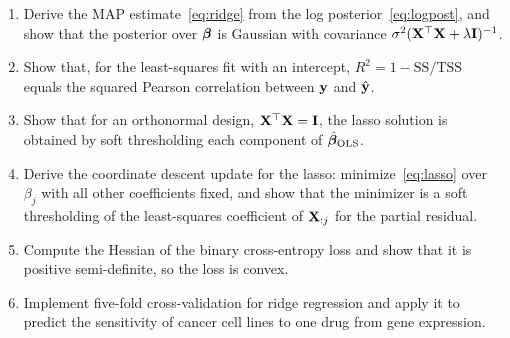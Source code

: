 \begin{enumerate}
  \item Derive the MAP estimate~\eqref{eq:ridge} from the log posterior~\eqref{eq:logpost}, and show that the posterior over $\boldsymbol{\beta}$ is Gaussian with covariance $\sigma^2(\mathbf{X}^\top\mathbf{X}+\lambda\mathbf{I})^{-1}$.
  \item Show that, for the least-squares fit with an intercept, $R^2=1-\text{SS}/\text{TSS}$ equals the squared Pearson correlation between $\mathbf{y}$ and $\hat{\mathbf{y}}$.
  \item Show that for an orthonormal design, $\mathbf{X}^\top\mathbf{X}=\mathbf{I}$, the lasso solution is obtained by soft thresholding each component of $\hat{\boldsymbol{\beta}}_{\text{OLS}}$.
  \item Derive the coordinate descent update for the lasso: minimize~\eqref{eq:lasso} over $\beta_j$ with all other coefficients fixed, and show that the minimizer is a soft thresholding of the least-squares coefficient of $\mathbf{X}_{:j}$ for the partial residual.
  \item Compute the Hessian of the binary cross-entropy loss and show that it is positive semi-definite, so the loss is convex.
  \item Implement five-fold cross-validation for ridge regression and apply it to predict the sensitivity of cancer cell lines to one drug from gene expression.
\end{enumerate}
